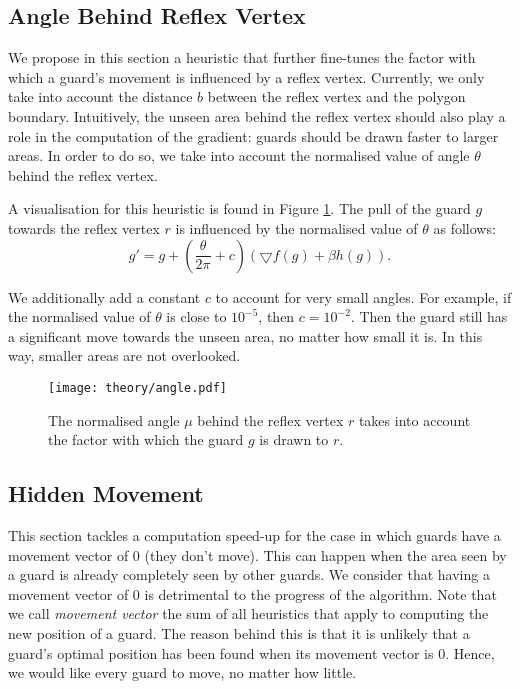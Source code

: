 \subsection{Angle Behind Reflex Vertex}
\label{sec:angle}
We propose in this section a heuristic that further fine-tunes the factor with which a guard's movement is influenced by a reflex vertex. Currently, we only take into account the distance $b$ between the reflex vertex and the polygon boundary. Intuitively, the unseen area behind the reflex vertex should also play a role in the computation of the gradient: guards should be drawn faster to larger areas. In order to do so, we  take into account the normalised value of angle $\theta$ behind the reflex vertex.

A visualisation for this heuristic is found in Figure \ref{fig:angle}. The pull of the guard $g$ towards the reflex vertex $r$ is influenced by the normalised value of $\theta$ as follows: $$g' = g + (\frac{\theta}{2\pi} + c)(\bigtriangledown f(g) + \beta h(g)).$$

We  additionally add a constant $c$ to account for very small angles. For example, if the normalised value of $\theta$ is close to $10^{-5}$, then $c = 10^{-2}$. Then the guard still has a significant move towards the unseen area, no matter how small it is. In this way, smaller areas are not overlooked.

\begin{figure}[h!]
    \centering
    \texttt{[image: theory/angle.pdf]}
    \caption{The normalised angle $\mu$ behind the reflex vertex $r$ takes into account the factor with which the guard $g$ is drawn to $r$.}
    \label{fig:angle}
\end{figure}

\subsection{Hidden Movement}
\label{sec:hidden_gradient}
This section tackles a computation speed-up for the case in which guards have a movement vector of 0 (they don't move). This can happen when the area seen by a guard is already completely seen by other guards. We consider that having a movement vector of 0 is detrimental to the progress of the algorithm. Note that we call \textit{movement vector} the sum of all heuristics that apply to computing the new position of a guard. The reason behind this is that it is unlikely that a guard's optimal position has been found when its movement vector is 0. Hence, we would like every guard to move, no matter how little.


